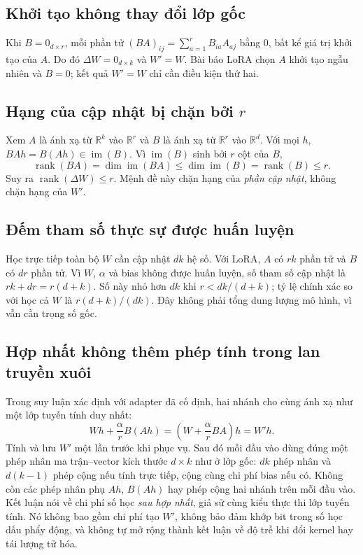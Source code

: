 \documentclass[11pt,a4paper]{article}
\DeclareMathOperator{\rank}{rank}
\DeclareMathOperator{\im}{im}
\newcommand{\R}{\mathbb{R}}
\begin{document}
\subsection*{Khởi tạo không thay đổi lớp gốc}
Khi $B=0_{d\times r}$, mỗi phần tử $(BA)_{ij}=\sum_{a=1}^{r} B_{ia}A_{aj}$ bằng $0$, bất kể giá trị khởi tạo của $A$. Do đó $\Delta W=0_{d\times k}$ và $W'=W$. Bài báo LoRA chọn $A$ khởi tạo ngẫu nhiên và $B=0$; kết quả $W'=W$ chỉ cần điều kiện thứ hai.

\subsection*{Hạng của cập nhật bị chặn bởi $r$}
Xem $A$ là ánh xạ từ $\R^k$ vào $\R^r$ và $B$ là ánh xạ từ $\R^r$ vào $\R^d$. Với mọi $h$, $BAh=B(Ah)\in\im(B)$. Vì $\im(B)$ sinh bởi $r$ cột của $B$,
\[
  \rank(BA)=\dim\im(BA)\le\dim\im(B)=\rank(B)\le r.
\]
Suy ra $\rank(\Delta W)\le r$. Mệnh đề này chặn hạng của \emph{phần cập nhật}, không chặn hạng của $W'$.

\subsection*{Đếm tham số thực sự được huấn luyện}
Học trực tiếp toàn bộ $W$ cần cập nhật $dk$ hệ số. Với LoRA, $A$ có $rk$ phần tử và $B$ có $dr$ phần tử. Vì $W$, $\alpha$ và bias không được huấn luyện, số tham số cập nhật là $rk+dr=r(d+k)$. Số này nhỏ hơn $dk$ khi $r<dk/(d+k)$; tỷ lệ chính xác so với học cả $W$ là $r(d+k)/(dk)$. Đây không phải tổng dung lượng mô hình, vì vẫn cần trọng số gốc.

\subsection*{Hợp nhất không thêm phép tính trong lan truyền xuôi}
Trong suy luận xác định với adapter đã cố định, hai nhánh cho cùng ánh xạ như một lớp tuyến tính duy nhất:
\[
  Wh+\frac{\alpha}{r}B(Ah)=\left(W+\frac{\alpha}{r}BA\right)h=W'h.
\]
Tính và lưu $W'$ một lần trước khi phục vụ. Sau đó mỗi đầu vào dùng đúng một phép nhân ma trận--vector kích thước $d\times k$ như ở lớp gốc: $dk$ phép nhân và $d(k-1)$ phép cộng nếu tính trực tiếp, cộng cùng chi phí bias nếu có. Không còn các phép nhân phụ $Ah$, $B(Ah)$ hay phép cộng hai nhánh trên mỗi đầu vào. Kết luận nói về chi phí số học \emph{sau hợp nhất}, giả sử cùng kiểu thực thi lớp tuyến tính. Nó không bao gồm chi phí tạo $W'$, không bảo đảm khớp bit trong số học dấu phẩy động, và không tự mở rộng thành kết luận về độ trễ khi đổi kernel hay tái lượng tử hóa.
\end{document}
